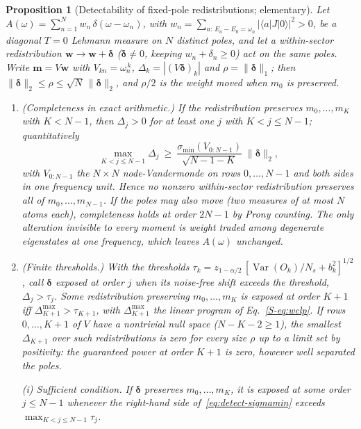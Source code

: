 \documentclass[aps,prb,reprint,onecolumn,12pt,superscriptaddress,longbibliography,floatfix]{revtex4-2}
\newtheorem{proposition}{Proposition}
\begin{document}
\begin{proposition}[Detectability of fixed-pole redistributions; elementary]
\label{thm:detect}\sloppy
Let $A(\omega)=\sum_{n=1}^{N}w_n\,\delta(\omega-\omega_n)$, with $w_n=\sum_{a:\,E_a-E_0=\omega_n}|\langle a|J|0\rangle|^2>0$, be a diagonal $T=0$ Lehmann measure on $N$ \emph{distinct} poles, and let a within-sector redistribution $\mathbf{w}\to\mathbf{w}+\bm{\delta}$ ($\bm{\delta}\neq0$, keeping $w_n+\delta_n\ge0$) act on the same poles. Write $\mathbf{m}=V\mathbf{w}$ with $V_{kn}=\omega_n^{\,k}$, $\Delta_k=|(V\bm{\delta})_k|$ and $\rho=\|\bm{\delta}\|_1$; then $\|\bm{\delta}\|_2\le\rho\le\sqrt{N}\,\|\bm{\delta}\|_2$, and $\rho/2$ is the weight moved when $m_0$ is preserved.
\begin{enumerate}
\item[(a)] \emph{(Completeness in exact arithmetic.)} If the redistribution preserves $m_0,\dots,m_K$ with ${K<N-1}$, then $\Delta_j>0$ for at least one $j$ with ${K<j\le N-1}$; quantitatively
\begin{equation}
\max_{K<j\le N-1}\Delta_j\ \ge\ \frac{\sigma_{\min}(V_{0:N-1})}{\sqrt{N-1-K}}\;\|\bm{\delta}\|_2,
\label{eq:detect-sigmamin}
\end{equation}
with $V_{0:N-1}$ the $N\times N$ node-Vandermonde on rows $0,\dots,N-1$ and both sides in one frequency unit. Hence no nonzero within-sector redistribution preserves all of $m_0,\dots,m_{N-1}$. If the poles may also move (two measures of at most $N$ atoms each), completeness holds at order $2N-1$ by Prony counting. The only alteration invisible to every moment is weight traded among degenerate eigenstates at one frequency, which leaves $A(\omega)$ unchanged.
\item[(b)] \emph{(Finite thresholds.)} With the thresholds $\tau_k=z_{1-\alpha/2}\,[\operatorname{Var}(O_k)/N_s+b_k^2]^{1/2}$, call $\bm{\delta}$ \emph{exposed} at order $j$ when its noise-free shift exceeds the threshold, $\Delta_j>\tau_j$. Some redistribution preserving $m_0,\dots,m_K$ is exposed at order $K{+}1$ iff $\Delta_{K+1}^{\max}>\tau_{K+1}$, with $\Delta_{K+1}^{\max}$ the linear program of Eq.~\eqref{S-eq:wclp}. If rows $0,\dots,K{+}1$ of $V$ have a nontrivial null space ($N-K-2\ge1$), the smallest $\Delta_{K+1}$ over such redistributions is zero for every size $\rho$ up to a limit set by positivity: the guaranteed power at order $K{+}1$ is zero, however well separated the poles.
\par\emph{(i) Sufficient condition.} If $\bm{\delta}$ preserves $m_0,\dots,m_K$, it is exposed at some order $j\le N-1$ whenever the right-hand side of~\eqref{eq:detect-sigmamin} exceeds $\max_{K<j\le N-1}\tau_j$.

\end{enumerate}
\end{proposition}
\end{document}
